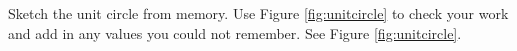 {Sketch the unit circle from memory. Use Figure \ref{fig:unitcircle} to check your work and add in any values you could not remember.}
{See Figure \ref{fig:unitcircle}.}
